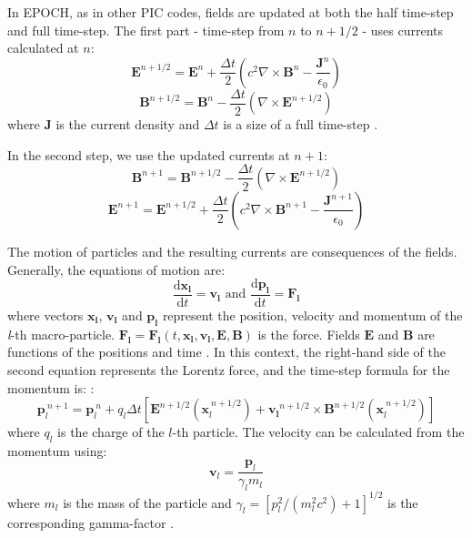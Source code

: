 In EPOCH, as in other PIC codes, fields are updated at both the half time-step and full time-step. The first part - time-step from $n$ to $n+1/2$ - uses currents calculated at $n$:
\begin{equation}
	\bm{E}^{n+1/2} = \bm{E}^n + \frac{\Delta t}{2}\left(c^2 \nabla\times\bm{B}^n - \frac{\bm{J}^n}{\epsilon_0}\right)
\end{equation}
\begin{equation} 
	\bm{B}^{n+1/2} = \bm{B}^n - \frac{\Delta t}{2}\left(\nabla\times\bm{E}^{n+1/2} \right)
\end{equation}
where $\bm{J}$ is the current density and $\Delta t$ is a size of a full time-step \cite{arber2015}.

In the second step, we use the updated currents at $n+1$:
\begin{equation} 
	\bm{B}^{n+1} = \bm{B}^{n+1/2} - \frac{\Delta t}{2}\left(\nabla\times\bm{E}^{n+1/2} \right)
\end{equation}
\begin{equation}
	\bm{E}^{n+1} = \bm{E}^{n+1/2} + \frac{\Delta t}{2}\left(c^2 \nabla\times\bm{B}^{n+1} - \frac{\bm{J}^{n+1}}{\epsilon_0}\right)
\end{equation}

The motion of particles and the resulting currents are consequences of the fields. Generally, the equations of motion are:
\begin{equation}
	\frac{\mathrm{d}\bm{x_l}}{\mathrm{d}t} = \bm{v_l} \text{   and   }  \frac{\mathrm{d}\bm{p_l}}{\mathrm{d}t} = \bm{F_l}
\end{equation}
where vectors $\bm{x_l}$,  $\bm{v_l}$  and $\bm{p_l}$ represent the position, velocity and momentum of the \textit{l}-th macro-particle. $\bm{F_l}=\bm{F_l}(t,\bm{x_l},\bm{v_l},\bm{E},\bm{B})$ is the force. Fields $\bm{E}$ and $\bm{B}$ are functions of the positions and time \cite{tskhakaya2007}.
In this context, the right-hand side of the second equation represents the Lorentz force, and the time-step formula for the momentum is: \cite{arber2015}:
\begin{equation}
	\bm{p}^{~n+1}_{l} = \bm{p}^{~n}_l + q_l\Delta t \left[\bm{E}^{n+1/2}\left(\bm{x}_l^{~n+1/2}\right)+\bm{v_l}^{n+1/2}\times \bm{B}^{n+1/2}\left(\bm{x}_l^{~n+1/2}\right) \right] 
	\label{eq:mom-up}
\end{equation}
where $q_l$ is the charge of the $l$-th particle. The velocity can be calculated from the momentum using:
\begin{equation}
	\bm{v}_l = \frac{\bm{p}_l}{\gamma_l m_l}
\end{equation}
where $m_l$ is the mass of the particle and $\gamma_l = [p_l^2/(m_l^2 c^2)+1]^{1/2}$ is the corresponding gamma-factor \cite{arber2015}.

